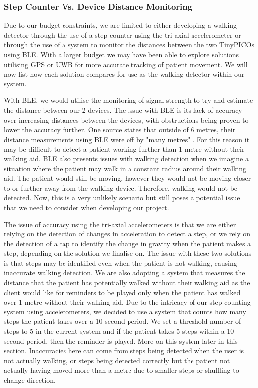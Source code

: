 {\subsubsection{Step Counter Vs. Device Distance Monitoring}

Due to our budget constraints, we are limited to either developing a walking detector through the use of a step-counter using the tri-axial accelerometer or through the use of a system to monitor the distances between the two TinyPICOs using BLE. With a larger budget we may have been able to explore solutions utilising GPS or UWB for more accurate tracking of patient movement. We will now list how each solution compares for use as the walking detector within our system.

With BLE, we would utilise the monitoring of signal strength to try and estimate the distance between our 2 devices. The issue with BLE is its lack of accuracy over increasing distances between the devices, with obstructions being proven to lower the accuracy further. One source states that outside of 6 metres, their distance measurements using BLE were off by "many metres" \cite{locatify_2020}. For this reason it may be difficult to detect a patient working further than 1 metre without their walking aid. BLE also presents issues with walking detection when we imagine a situation where the patient may walk in a constant radius around their walking aid. The patient would still be moving, however they would not be moving closer to or further away from the walking device. Therefore, walking would not be detected. Now, this is a very unlikely scenario but still poses a potential issue that we need to consider when developing our project.

The issue of accuracy using the tri-axial accelerometers is that we are either relying on the detection of changes in acceleration to detect a step, or we rely on the detection of a tap to identify the change in gravity when the patient makes a step, depending on the solution we finalise on. The issue with these two solutions is that steps may be identified even when the patient is not walking, causing inaccurate walking detection. We are also adopting a system that measures the distance that the patient has potentially walked without their walking aid as the client would like for reminders to be played only when the patient has walked over 1 metre without their walking aid. Due to the intricacy of our step counting system using accelerometers, we decided to use a system that counts how many steps the patient takes over a 10 second period. We set a threshold number of steps to 5 in the current system and if the patient takes 5 steps within a 10 second period, then the reminder is played. More on this system later in this section. Inaccuracies here can come from steps being detected when the user is not actually walking, or steps being detected correctly but the patient not actually having moved more than a metre due to smaller steps or shuffling to change direction.

}